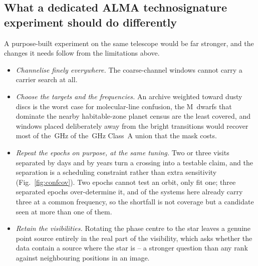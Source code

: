\subsection{What a dedicated ALMA technosignature experiment should do
differently}
\label{sec:future}

A purpose-built experiment on the same telescope would be far stronger, and
the changes it needs follow from the limitations above.

\begin{itemize}[leftmargin=1.2em,itemsep=2pt,topsep=3pt,parsep=0pt]
\item \emph{Channelise finely everywhere.} The \NCoarse{} coarse-channel
windows cannot carry a carrier search at all.
\item \emph{Choose the targets and the frequencies.} An archive weighted
toward dusty discs is the worst case for molecular-line confusion, the
M~dwarfs that dominate the nearby habitable-zone planet census are the least
covered, and windows placed deliberately away from the bright transitions
would recover most of the \MkMaskAGHz\,GHz of the \CvUnionA\,GHz Class~A
union that the mask costs.
\item \emph{Repeat the epochs on purpose, at the same tuning.} Two or three
visits separated by days and by years turn a crossing into a testable claim,
and the separation is a scheduling constraint rather than extra sensitivity
(Fig.~\ref{fig:confcov}). Two epochs cannot test an orbit, only fit one;
three separated epochs over-determine it, and \PaNSysThree{} of the
\NSysClassA{} systems here already carry three at a common frequency, so the
shortfall is not coverage but a candidate seen at more than one of them.
\item \emph{Retain the visibilities.} Rotating the phase centre to the star
leaves a genuine point source entirely in the real part of the visibility,
which asks whether the data contain a source where the star is -- a stronger
question than any rank against neighbouring positions in an image.
\end{itemize}
